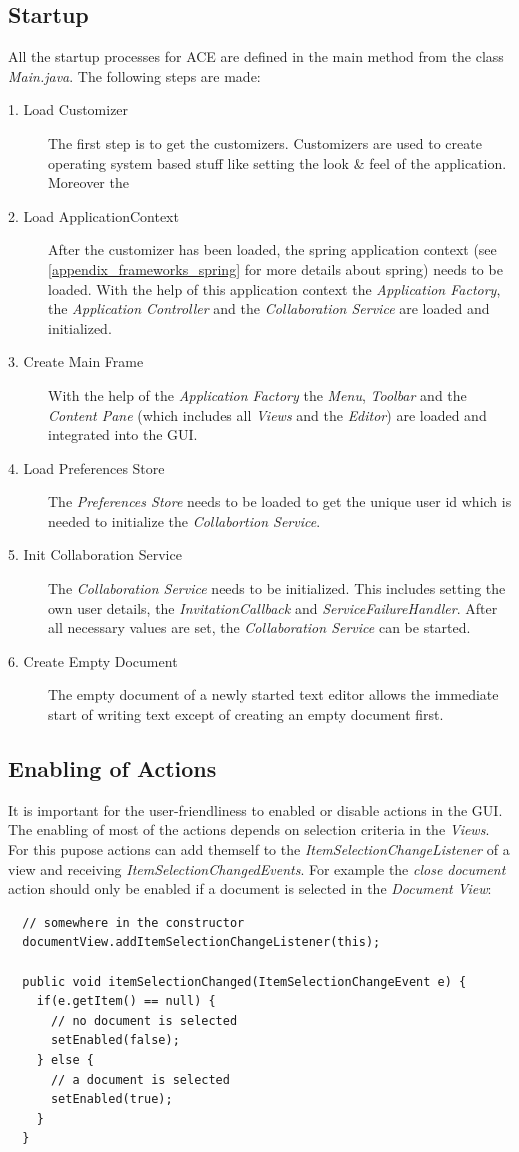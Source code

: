 \subsection{Startup}
\label{applicationlayer_wf_startup}
All the startup processes for ACE are defined in the main method from the class \textit{Main.java}. The following steps are made:
\begin{description}
\item[1. Load Customizer ] The first step is to get the customizers. Customizers are used to create operating system based stuff like setting the look \& feel of the application. Moreover the 
\item[2. Load ApplicationContext ] After the customizer has been loaded, the spring application context (see \ref{appendix_frameworks_spring} for more details about spring) needs to be loaded. With the help of this application context the \textit{Application Factory}, the \textit{Application Controller} and the \textit{Collaboration Service} are loaded and initialized.
\item[3. Create Main Frame ] With the help of the \textit{Application Factory} the \textit{Menu}, \textit{Toolbar} and the \textit{Content Pane} (which includes all \textit{Views} and the \textit{Editor}) are loaded and integrated into the GUI.
\item[4. Load Preferences Store ] The \textit{Preferences Store} needs to be loaded to get the unique user id which is needed to initialize the \textit{Collabortion Service}.
\item[5. Init Collaboration Service ] The \textit{Collaboration Service} needs to be initialized. This includes setting the own user details, the \textit{InvitationCallback} and \textit{ServiceFailureHandler}. After all necessary values are set, the \textit{Collaboration Service} can be started.
\item[6. Create Empty Document ] The empty document of a newly started text editor allows the immediate start of writing text except of creating an empty document first.
\end{description}

\subsection{Enabling of Actions}
It is important for the user-friendliness to enabled or disable actions in the GUI. The enabling of most of the actions depends on selection criteria in the \textit{Views}. For this pupose actions can add themself to the \textit{ItemSelectionChangeListener} of a view and receiving \textit{ItemSelectionChangedEvents}.  For example the \textit{close document} action should only be enabled if a document is selected in the \textit{Document View}:
\begin{verbatim}
  // somewhere in the constructor
  documentView.addItemSelectionChangeListener(this);

  public void itemSelectionChanged(ItemSelectionChangeEvent e) {
    if(e.getItem() == null) {
      // no document is selected
      setEnabled(false);
    } else {
      // a document is selected
      setEnabled(true);
    }
  }
\end{verbatim}

